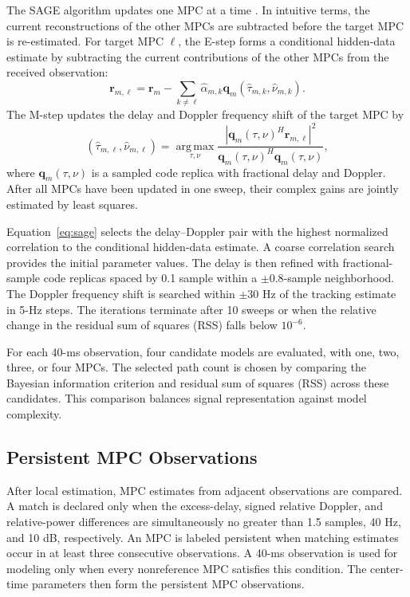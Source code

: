 \documentclass[conference]{IEEEtran}
\begin{document}
The SAGE algorithm updates one MPC at a time \cite{fessler1994sage,fleury1999sage}. In intuitive terms, the current reconstructions of the other MPCs are subtracted before the target MPC is re-estimated. For target MPC $\ell$, the E-step forms a conditional hidden-data estimate by subtracting the current contributions of the other MPCs from the received observation:
\begin{equation}
\mathbf r_{m,\ell}=\mathbf r_m-\sum_{k\ne\ell}\hat\alpha_{m,k}
\mathbf q_m(\hat\tau_{m,k},\hat\nu_{m,k}).
\label{eq:hidden}
\end{equation}
The M-step updates the delay and Doppler frequency shift of the target MPC by
\begin{equation}
(\hat\tau_{m,\ell},\hat\nu_{m,\ell})=
\operatorname*{arg\,max}_{\tau,\nu}
\frac{|\mathbf q_m(\tau,\nu)^H\mathbf r_{m,\ell}|^2}
{\mathbf q_m(\tau,\nu)^H\mathbf q_m(\tau,\nu)},
\label{eq:sage}
\end{equation}
where $\mathbf q_m(\tau,\nu)$ is a sampled code replica with fractional delay and Doppler. After all MPCs have been updated in one sweep, their complex gains are jointly estimated by least squares.

Equation~\eqref{eq:sage} selects the delay--Doppler pair with the highest normalized correlation to the conditional hidden-data estimate. A coarse correlation search provides the initial parameter values. The delay is then refined with fractional-sample code replicas spaced by 0.1 sample within a $\pm0.8$-sample neighborhood. The Doppler frequency shift is searched within $\pm30$ Hz of the tracking estimate in 5-Hz steps. The iterations terminate after 10 sweeps or when the relative change in the residual sum of squares (RSS) falls below $10^{-6}$.

For each 40-ms observation, four candidate models are evaluated, with one, two, three, or four MPCs. The selected path count is chosen by comparing the Bayesian information criterion and residual sum of squares (RSS) across these candidates. This comparison balances signal representation against model complexity.

\subsection{Persistent MPC Observations}
After local estimation, MPC estimates from adjacent observations are compared. A match is declared only when the excess-delay, signed relative Doppler, and relative-power differences are simultaneously no greater than 1.5 samples, 40 Hz, and 10 dB, respectively. An MPC is labeled persistent when matching estimates occur in at least three consecutive observations. A 40-ms observation is used for modeling only when every nonreference MPC satisfies this condition. The center-time parameters then form the persistent MPC observations.
\end{document}

